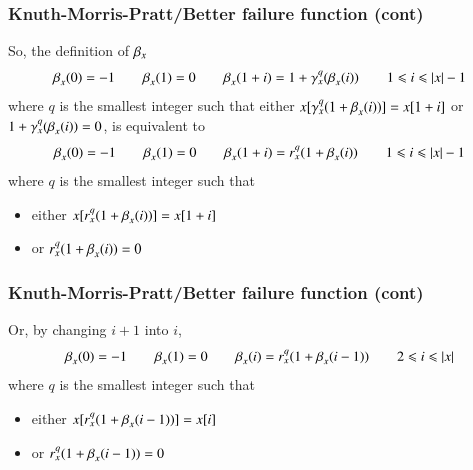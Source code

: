 %
\begin{frame}
\frametitle{Knuth-Morris-Pratt/Better failure function (cont)}

So, the definition of \(\beta_{x}\)
\[
\beta_{x}^{}(0) = -1
\qquad
\beta_{x}^{}(1) = 0
\qquad
\beta_{x}^{}(1+i) = 1 + \gamma_{x}^{q}(\beta_{x}^{}(i))
\qquad 1 \leqslant i \leqslant \lvert{x}\lvert{} - 1
\]
where \(q\) is the smallest integer such that either
\(x[\gamma_{x}^{q}(1 + \beta_{x}^{}(i))]=x[1+i]\) or
\(1+\gamma_{x}^{q}(\beta_{x}^{}(i)) = 0\), is equivalent to
\[
\beta_{x}^{}(0) = -1
\qquad
\beta_{x}^{}(1) = 0
\qquad
\beta_{x}^{}(1+i) = r_{x}^{q}(1 + \beta_{x}^{}(i))
\qquad 1 \leqslant i \leqslant \lvert{x}\lvert{} - 1
\]
where \(q\) is the smallest integer such that
\begin{itemize}

  \item either \(x[r_{x}^{q}(1 + \beta_{x}^{}(i))]=x[1+i]\)

  \item or \(r_{x}^{q}(1 + \beta_{x}^{}(i)) = 0\)

\end{itemize}

\end{frame}

%
\begin{frame}
\frametitle{Knuth-Morris-Pratt/Better failure function (cont)}

Or, by changing \(i+1\) into \(i\),
\[
\beta_{x}^{}(0) = -1
\qquad
\beta_{x}^{}(1) = 0
\qquad
\beta_{x}^{}(i) = r_{x}^{q}(1 + \beta_{x}^{}(i-1))
\qquad 2 \leqslant i \leqslant \lvert{x}\lvert{}
\]
where \(q\) is the smallest integer such that
\begin{itemize}

  \item either \(x[r_{x}^{q}(1 + \beta_{x}^{}(i-1))]=x[i]\)

  \item or \(r_{x}^{q}(1 + \beta_{x}^{}(i-1)) = 0\)

\end{itemize}

\end{frame}

